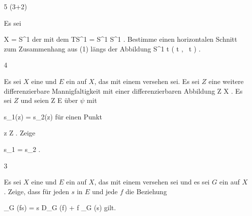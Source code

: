
{5 (3+2)}
{

Es sei

\mavergleichskette
{\vergleichskette
{ X
}
{ = }{ S^1
}
{  }{
}
{    }{
}
{   }{
}
}
{}{}{}
der
mit dem
 {TS^1 = S^1 \times \R} { S^1
} {.}
 {Bestimme einen horizontalen Schnitt zum Zusammenhang aus (1) längs der Abbildung
\maabbeledisp {} {\R} { S^1
} { t } { \left(  \cos  t   , \,   \sin  t                   \right)
} {.}
}

}
{} {}

{4}
{

Es sei $X$ eine
und $E$ ein
auf $X$, das mit einem
versehen sei. Es sei $Z$ eine weitere differenzierbare Mannigfaltigkeit mit einer differenzierbaren Abbildung
\maabb {\psi} { Z } { X
} {.}
Es sei $Z$
und seien
 { Z } { E
} {}
über $\psi$ mit

\mavergleichskette
{\vergleichskette
{ s_1(z)
}
{ = }{ s_2(z)
}
{  }{
}
{    }{
}
{   }{
}
}
{}{}{}
für einen Punkt

\mavergleichskette
{\vergleichskette
{ z
}
{ \in }{ Z
}
{  }{
}
{    }{
}
{   }{
}
}
{}{}{.}
Zeige

\mavergleichskette
{\vergleichskette
{ s_1
}
{ = }{ s_2
}
{  }{
}
{    }{
}
{   }{
}
}
{}{}{.}

}
{} {}

{3}
{

Es sei $X$ eine
und $E$ ein
  auf $X$, das mit einem
versehen sei und es sei $G$ ein
auf $X$. Zeige, dass für jeden
$s$ in $E$ und jede
$f$
 {} {}
die Beziehung

\mavergleichskettedisp
{\vergleichskette
{ \nabla_G (fs)
}
{ =} { s \otimes D_G (f) + f \nabla_G (s)
}
{ } {
}
{ } {
}
{ } {
}
}
{}{}{}
gilt.

}
{} {}


